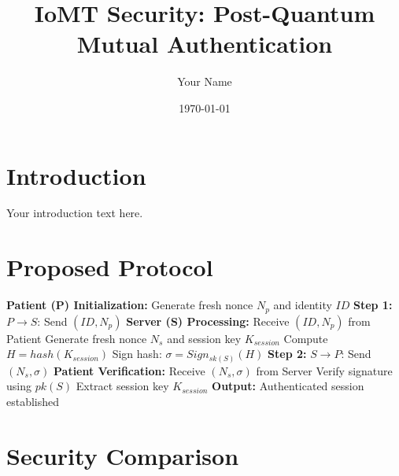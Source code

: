 \documentclass{article}
\title{IoMT Security: Post-Quantum Mutual Authentication}
\author{Your Name}
\date{\today}
\begin{document}
\maketitle

\section{Introduction}
Your introduction text here.

\section{Proposed Protocol}

\begin{algorithm}[H]
\caption{PQC-MFA Authentication Protocol}
\label{alg:pqc-mfa}
\begin{algorithmic}[1]
\State \textbf{Patient (P) Initialization:}
\State Generate fresh nonce $N_p$ and identity $ID$
\State \textbf{Step 1:} $P \rightarrow S$: Send $(ID, N_p)$
\State
\State \textbf{Server (S) Processing:}
\State Receive $(ID, N_p)$ from Patient
\State Generate fresh nonce $N_s$ and session key $K_{session}$
\State Compute $H = hash(K_{session})$
\State Sign hash: $\sigma = Sign_{sk(S)}(H)$
\State \textbf{Step 2:} $S \rightarrow P$: Send $(N_s, \sigma)$
\State
\State \textbf{Patient Verification:}
\State Receive $(N_s, \sigma)$ from Server
\State Verify signature using $pk(S)$
\State Extract session key $K_{session}$
\State \textbf{Output:} Authenticated session established
\end{algorithmic}
\end{algorithm}

\section{Security Comparison}
\end{document}
